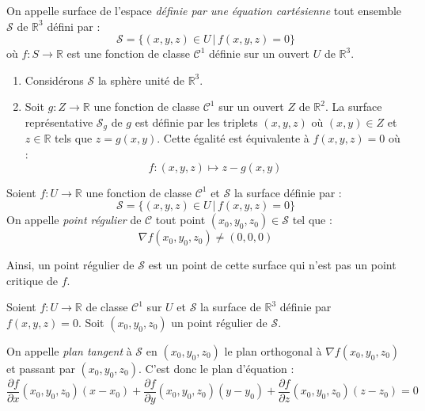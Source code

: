 \documentclass[french,11pt,twoside]{VcCours}
\begin{document}
On appelle surface de l'espace \emph{définie par une équation cartésienne} tout ensemble $\mathcal{S}$ de $\mathbb{R}^3$ défini par :
$$ \mathcal{S} = \lbrace (x,y,z) \in U \, \vert \, f(x,y,z)=0 \rbrace$$
où $f : S \rightarrow \mathbb{R}$ est une fonction de classe $\mathcal{C}^1$ définie sur un ouvert $U$ de $\mathbb{R}^3$.

\medskip

\begin{Exemples}{}
\begin{enumerate}
\item Considérons $\mathcal{S}$ la sphère unité de $\mathbb{R}^3$.

\vspace{5cm}
\item Soit $g : Z \rightarrow \mathbb{R}$ une fonction de classe $\mathcal{C}^1$ sur un ouvert $Z$ de $\mathbb{R}^2$. La surface représentative $\mathcal{S}_g$ de $g$ est définie par les triplets $(x,y,z)$ où $(x,y) \in Z$ et $z \in \mathbb{R}$ tels que $z=g(x,y)$. Cette égalité est équivalente à $f(x,y,z) =0$ où :
$$ f : (x,y,z) \mapsto z-g(x,y) $$
\end{enumerate}
\end{Exemples}

\begin{Definition}{} Soient $f : U \rightarrow \mathbb{R}$ une fonction de classe $\mathcal{C}^1$ et $\mathcal{S}$ la surface définie par :
$$ \mathcal{S} = \lbrace (x,y,z) \in U \, \vert \, f(x,y,z)=0 \rbrace$$
On appelle \emph{point régulier} de $\mathcal{C}$ tout point $(x_0,y_0,z_0) \in \mathcal{S}$ tel que :
$$ \nabla f(x_0,y_0,z_0) \neq (0,0,0)$$
\end{Definition}

Ainsi, un point régulier de $\mathcal{S}$ est un point de cette surface qui n'est pas un point critique de $f$.

\begin{Definition}{} Soient $f : U \rightarrow \mathbb{R}$ de classe $\mathcal{C}^1$ sur $U$ et $\mathcal{S}$ la surface de $\mathbb{R}^3$ définie par $f(x,y,z)=0$. Soit $(x_0,y_0,z_0)$ un point régulier de $\mathcal{S}$.

On appelle \emph{plan tangent} à $\mathcal{S}$ en $(x_0,y_0,z_0)$ le plan orthogonal à $\nabla f(x_0,y_0,z_0)$ et passant par $(x_0,y_0,z_0)$. C'est donc le plan d'équation :
$$ \dfrac{\partial f}{\partial x}(x_0,y_0,z_0) (x-x_0) +  \dfrac{\partial f}{\partial y}(x_0,y_0,z_0) (y-y_0) +  \dfrac{\partial f}{\partial z}(x_0,y_0,z_0) (z-z_0) = 0$$
\end{Definition}
\end{document}
